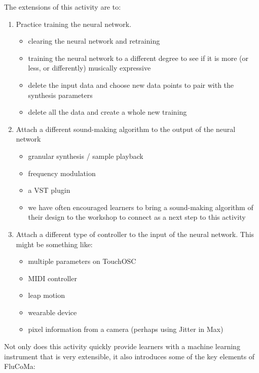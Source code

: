 \documentclass{article}
\providecommand{\tightlist}{%
  \setlength{\itemsep}{0pt}\setlength{\parskip}{0pt}}
\begin{document}
The extensions of this activity are to:

\begin{enumerate}
\def\labelenumi{\arabic{enumi}.}
\tightlist
\item
  Practice training the neural network.

  \begin{itemize}
  \tightlist
  \item
    clearing the neural network and retraining
  \item
    training the neural network to a different degree to see if it is more (or less, or differently) musically
    expressive
  \item
    delete the input data and choose new data points to pair with the
    synthesis parameters
  \item
    delete all the data and create a whole new training
  \end{itemize}
\item
  Attach a different sound-making algorithm to the output of the neural
  network

  \begin{itemize}
  \tightlist
  \item
    granular synthesis / sample playback
  \item
    frequency modulation
  \item
    a VST plugin
  \item
    we have often encouraged learners to bring a sound-making algorithm
    of their design to the workshop to connect as a next step to this
    activity
  \end{itemize}
\item
  Attach a different type of controller to the input of the neural
  network. This might be something like:

  \begin{itemize}
  \tightlist
  \item
    multiple parameters on TouchOSC
  \item
    MIDI controller
  \item
    leap motion
  \item
    wearable device
  \item
    pixel information from a camera (perhaps using Jitter in Max)
  \end{itemize}
\end{enumerate}

Not only does this activity quickly provide learners with a machine
learning instrument that is very extensible, it also introduces some of
the key elements of FluCoMa:
\end{document}
